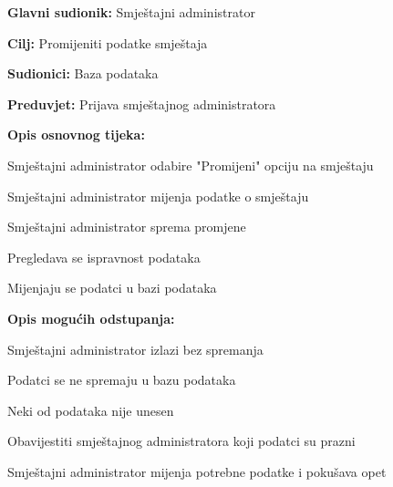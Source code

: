 				\noindent {}
				\begin{packed_item}
					
					\item \textbf{Glavni sudionik: }Smještajni administrator
					\item  \textbf{Cilj:} Promijeniti podatke smještaja
					\item  \textbf{Sudionici:} Baza podataka
					\item  \textbf{Preduvjet:} Prijava smještajnog administratora
					\item  \textbf{Opis osnovnog tijeka:}
					
					\item[] \begin{packed_enum}
						
						\item Smještajni administrator odabire "Promijeni" opciju na smještaju
						\item Smještajni administrator mijenja podatke o smještaju
						\item Smještajni administrator sprema promjene
						\item Pregledava se ispravnost podataka
						\item Mijenjaju se podatci u bazi podataka
					\end{packed_enum}
					
					\item  \textbf{Opis mogućih odstupanja:}
					
					\item[] \begin{packed_item}
						
						\item[3.a] Smještajni administrator izlazi bez spremanja
						\item[] \begin{packed_enum}
							
							\item Podatci se ne spremaju u bazu podataka
							
						\end{packed_enum}
						
						\item[4.a] Neki od podataka nije unesen
						\item[] \begin{packed_enum}
							
							\item Obavijestiti smještajnog administratora koji podatci su prazni
							\item Smještajni administrator mijenja potrebne podatke i pokušava opet
							
						\end{packed_enum}
						
					\end{packed_item}
				\end{packed_item}
				
